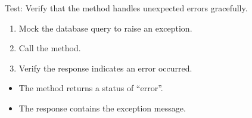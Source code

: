 \documentclass[letterpaper,10pt,english]{sphinxmanual}
\begin{document}
\begin{fulllineitems}
\label{\detokenize{test:test.test_admin.test_get_admin_by_id_unexpected_error}}
\pysigstartsignatures
\pysiglinewithargsret
{}
{\sphinxparamcomma {}}
{}
\pysigstopsignatures
\sphinxAtStartPar
Test: Verify that the method handles unexpected errors gracefully.
\begin{description}
\begin{enumerate}
%
\item {} 
\sphinxAtStartPar
Mock the database query to raise an exception.

\item {} 
\sphinxAtStartPar
Call the  method.

\item {} 
\sphinxAtStartPar
Verify the response indicates an error occurred.

\end{enumerate}

\begin{itemize}
\item {} 
\sphinxAtStartPar
The method returns a status of “error”.

\item {} 
\sphinxAtStartPar
The response contains the exception message.

\end{itemize}

\end{description}

\end{fulllineitems}

\end{document}
